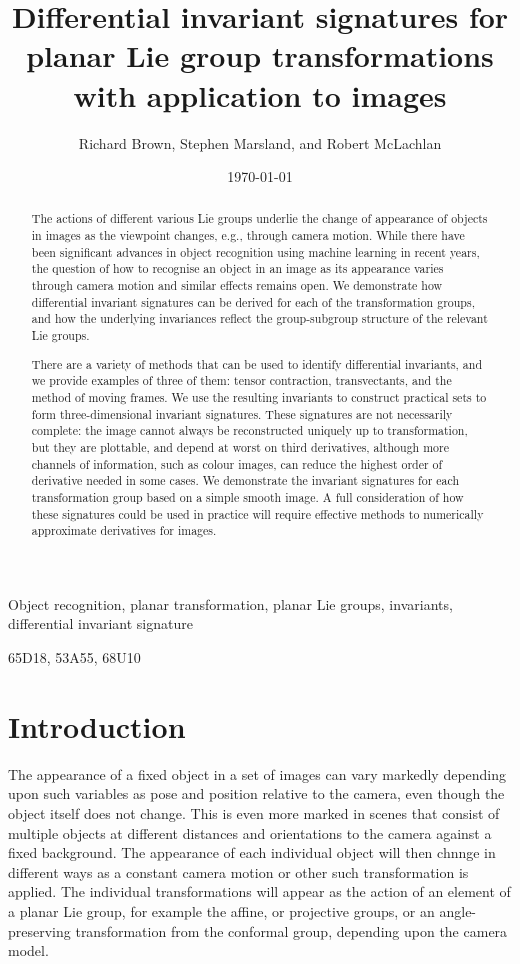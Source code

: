 \documentclass[review,onefignum,onetabnum]{siamonline190516}
\date{\today}
\title{Differential invariant signatures for planar Lie group transformations with application to images}
\author{Richard Brown, Stephen Marsland, and Robert McLachlan}
\begin{document}
\maketitle
\begin{abstract}
The actions of different various Lie groups underlie the change of appearance of objects in images as the viewpoint changes, e.g., through camera motion. While there have been significant advances in object recognition using machine learning in recent years, the question of how to recognise an object in an image as its appearance varies through camera motion and similar effects remains open. We demonstrate how differential invariant signatures can be derived for each of the transformation groups, and how the underlying invariances reflect the group-subgroup structure of the relevant Lie groups. 

There are a variety of methods that can be used to identify differential invariants, and we provide examples of three of them: tensor contraction, transvectants, and the method of moving frames. We use the resulting invariants to construct practical sets to form three-dimensional invariant signatures. These signatures are not necessarily complete: the image cannot always be reconstructed uniquely up to transformation, but they are plottable, and depend at worst on third derivatives, although more channels of information, such as colour images, can reduce the highest order of derivative needed in some cases. We demonstrate the invariant signatures for each transformation group based on a simple smooth image. A full consideration of how these signatures could be used in practice will require effective methods to numerically approximate derivatives for images.
\end{abstract}


\begin{keywords}
Object recognition, planar transformation, planar Lie groups, invariants, differential invariant signature
\end{keywords}

\begin{AMS}
65D18, 53A55, 68U10
\end{AMS}

\section{Introduction}
The appearance of a fixed object in a set of images can vary markedly depending upon such variables as pose and position relative to the camera, even though the object itself does not change. This is even more marked in scenes that consist of multiple objects at different distances and orientations to the camera against a fixed background. The appearance of each individual object will then chnnge in different ways as a constant camera motion or other such transformation is applied. The individual transformations will appear as the action of an element of a planar Lie group, for example the affine, or projective groups, or an angle-preserving transformation from the conformal group, depending upon the camera model. 
\end{document}
